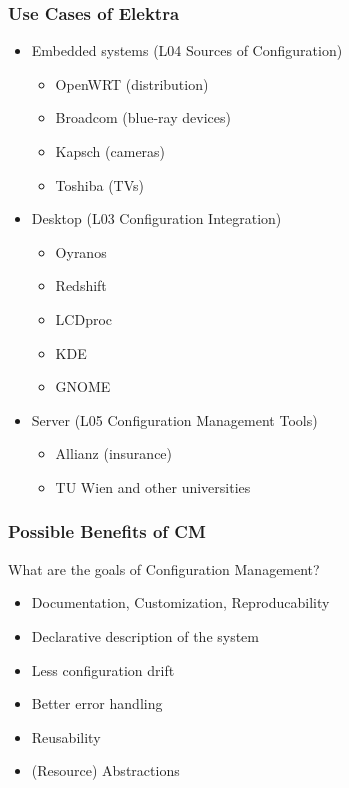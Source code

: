 \begin{frame}
	\frametitle{Use Cases of Elektra}
	\begin{itemize}[<+->]
	\item Embedded systems (L04 Sources of Configuration)
	\begin{itemize}
	\item OpenWRT (distribution)
	\item Broadcom (blue-ray devices)
	\item Kapsch (cameras)
	\item Toshiba (TVs)
	\end{itemize}
	\item Desktop (L03 Configuration Integration)
	\begin{itemize}
	\item Oyranos
	\item Redshift
	\item LCDproc
	\item KDE
	\item GNOME
	\end{itemize}
	\item Server (L05 Configuration Management Tools)
	\begin{itemize}
	\item Allianz (insurance)
	\item TU Wien and other universities
	\end{itemize}
	\end{itemize}
\end{frame}

\begin{frame}
	\frametitle{Possible Benefits of CM}

	\begin{task}
	What are the goals of Configuration Management?
	\end{task}

	\pause

	\begin{itemize}[<+-| alert@+>]
	\item Documentation, Customization, Reproducability
	\item Declarative description of the system
	\item Less configuration drift
	\item Better error handling
	\item Reusability
	\item (Resource) Abstractions
	\end{itemize}
\end{frame}

